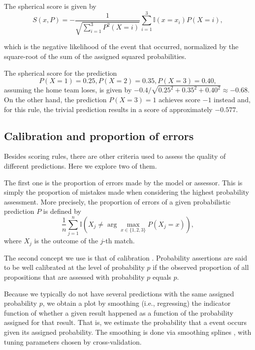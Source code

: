 \documentclass[journal,article,accept,moreauthors,pdftex,12pt,a4paper]{mdpi}
\begin{document}
	The spherical score is given by
	$$S(x,P)=- \frac{1}{\sqrt{\sum_{i=1}^3 P^2(X=i)}}\sum_{i=1}^3\mathbb{I}(x=x_i)P(X=i),$$
	
	\noindent
	which is the negative likelihood of the event that occurred, normalized by the square-root of the sum of the assigned squared probabilities.
	
	The spherical score for the prediction 
		$$P(X=1)=0.25, P(X=2)=0.35, P(X=3)=0.40,$$ 
		 assuming the home team loses, is given by
	$-0.4/\sqrt{0.25^2+0.35^2+0.40^2} \approx -0.68$.
	On the other hand, the prediction $P(X=3)=1$ achieves score  $-1$ instead and, for this rule, the trivial prediction results in a score of approximately $-0.577$.
	
	\subsection{Calibration and proportion of errors}
	\label{sec::calib}
	
	Besides scoring rules, there are other criteria used to assess the quality of different predictions. Here we explore two of them.
	
	The first one is the proportion of errors made by the model or assessor. This is simply the proportion of mistakes made when considering the highest probability assessment.
	More precisely, the proportion of errors of a given probabilistic prediction $P$ is defined by
	$$\frac{1}{n}\sum_{j=1}^n \mathbb{I}\left(X_j \neq \arg \max_{x \in \{1,2,3\}} P(X_j=x)\right),$$
	where $X_j$ is the outcome of the $j$-th match.
	
	The second concept we use is that of calibration \cite{Dawid}. Probability assertions are said to be well calibrated at the level of probability $p$ if the observed proportion of all propositions that are assessed with probability $p$ equals $p$.
	
	Because we typically do not have several predictions with the same assigned probability $p$, we obtain a plot by smoothing (i.e., regressing) the indicator function of whether a given result happened as a function of the probability assigned for that result.
	That is, we estimate the probability that a event occurs given its assigned probability.
	The smoothing is done via smoothing splines \cite{wahba}, with tuning parameters chosen by cross-validation.
	
\end{document}
